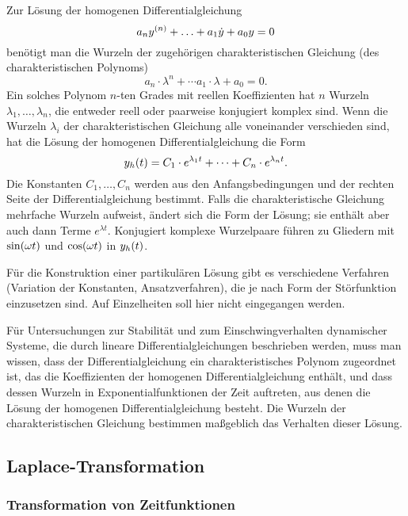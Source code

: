 Zur Lösung der homogenen Differentialgleichung
\begin{equation}
	a_n y^{\parentheses*{n}} + \ldots + a_1 \dot{y} + a_0 y = 0
\end{equation}
benötigt man die Wurzeln der zugehörigen charakteristischen Gleichung (des charakteristischen Polynoms)
\begin{equation}
	a_n \cdot \lambda^n + \cdots a_1 \cdot \lambda + a_0 = 0.
\end{equation}
Ein solches Polynom \(n\)-ten Grades mit reellen Koeffizienten hat \(n\) Wurzeln \(\lambda_1, \ldots, \lambda_n\), die entweder reell oder paarweise konjugiert komplex sind.
Wenn die Wurzeln \(\lambda_i\) der charakteristischen Gleichung alle voneinander verschieden sind, hat die Lösung der homogenen Differentialgleichung die Form
\begin{equation}
	y_h\parentheses*{t} = C_1 \cdot e^{\lambda_1 t} + \cdots + C_n \cdot e^{\lambda_n t}.
\end{equation}
Die Konstanten \(C_1, \ldots, C_n\) werden aus den Anfangsbedingungen und der rechten Seite der Differentialgleichung bestimmt.
Falls die charakteristische Gleichung mehrfache Wurzeln aufweist, ändert sich die Form der Lösung; sie enthält aber auch dann Terme \(e^{\lambda t}\).
Konjugiert komplexe Wurzelpaare führen zu Gliedern mit \(\sin\parentheses*{\omega t}\) und \(\cos\parentheses*{\omega t}\) in \(y_h\parentheses*{t}\).

Für die Konstruktion einer partikulären Lösung gibt es verschiedene Verfahren (Variation der Konstanten, Ansatzverfahren), die je nach Form der Störfunktion einzusetzen sind.
Auf Einzelheiten soll hier nicht eingegangen werden.

Für Untersuchungen zur Stabilität und zum Einschwingverhalten dynamischer Systeme, die durch lineare Differentialgleichungen beschrieben werden, muss man wissen, dass der Differentialgleichung ein charakteristisches Polynom zugeordnet ist, das die Koeffizienten der homogenen Differentialgleichung enthält, und dass dessen Wurzeln in Exponentialfunktionen der Zeit auftreten, aus denen die Lösung der homogenen Differentialgleichung besteht.
Die Wurzeln der charakteristischen Gleichung bestimmen maßgeblich das Verhalten dieser Lösung.


\subsection{Laplace-Transformation}


\subsubsection{Transformation von Zeitfunktionen}


